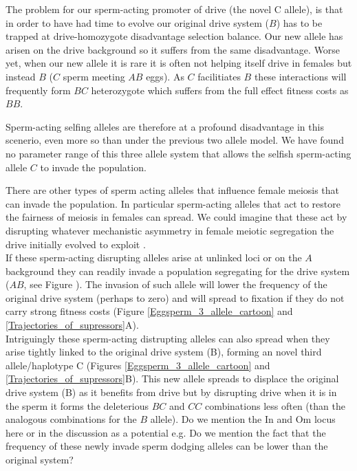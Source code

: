\documentclass[12pt,letterpaper]{article}
\newcommand{\gc}[1]{{ \color{red} #1}}
\begin{document}
The problem for our sperm-acting promoter of drive (the novel C
allele), is that in order to have had time to evolve our original
drive system ($B$) has to be trapped at drive-homozygote disadvantage selection balance. 
Our new allele has arisen on the drive background so it
suffers from the same disadvantage. 
Worse yet, when our new allele it is rare it is often not helping
itself drive in females but instead $B$ ($C$ sperm meeting $AB$ eggs).
As $C$ facilitiates $B$ these interactions will frequently form 
$BC$ heterozygote which suffers from the full
effect fitness costs as $BB$. 

Sperm-acting selfing alleles are therefore at a profound disadvantage
in this scenerio, even more so than under the previous two allele model.
We have found no parameter range of this
three allele system that allows the selfish sperm-acting allele $C$ to
invade the population. 

There are other types of sperm acting alleles that influence
female meiosis that can invade the population. 
In particular sperm-acting alleles that act to restore 
the fairness of meiosis in females can spread. 
We could imagine that these act by 
disrupting whatever mechanistic asymmetry in female meiotic segregation the
drive initially evolved to exploit \citep{Pardo-ManuelDeVillena2001a}.\\

If these sperm-acting disrupting alleles arise at unlinked loci or on
the $A$ background they can readily invade a population segregating
for the drive system ($AB$, see Figure ). The invasion of such allele
will lower the frequency of the original drive system (perhaps to zero)
and will spread to fixation if they do not carry strong fitness costs
(Figure \ref{Eggsperm_3_allele_cartoon} and \ref{Trajectories_of_supressors}A). \\


Intriguingly these sperm-acting distrupting alleles can also spread
when they arise tightly linked to the original drive system (B), forming
an novel third allele/haplotype C (Figures \ref{Eggsperm_3_allele_cartoon} and \ref{Trajectories_of_supressors}B). This new allele spreads
to displace the original drive system (B) as it benefits from drive
but by disrupting drive when it is in the sperm it forms
 the deleterious $BC$ and $CC$ combinations less often (than the
 analogous combinations for the $B$ allele). 
\gc{Do we mention the In and Om locus here or in the discussion as a
  potential e.g. Do we mention the fact that the frequency of these
  newly invade sperm dodging alleles can be lower than the original system?}\\
\end{document}
